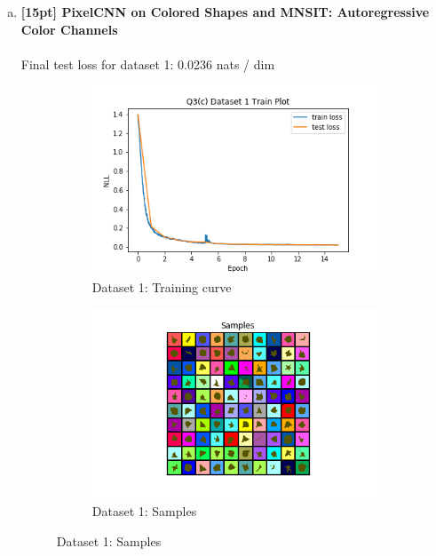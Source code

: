 \documentclass{article}
\begin{document}
\begin{enumerate}[(a)]
\newpage

\item {\bf [15pt] PixelCNN on Colored Shapes and MNSIT: Autoregressive Color Channels} \\\\
Final test loss for dataset 1: 0.0236  nats / dim
\begin{figure}[H]
    \centering
    \begin{subfigure}{0.45\textwidth}
        \centering
        \includegraphics[width=\textwidth]{figures/q3_c_dset1_train_plot.png}
        \caption{Dataset 1: Training curve}
    \end{subfigure}
    \hspace{0.2in}
    \begin{subfigure}{0.45\textwidth}
        \centering
        \includegraphics[width=\textwidth]{figures/q3_c_dset1_samples.png}
        \caption{Dataset 1: Samples}

\end{subfigure}
\end{figure}
\end{enumerate}
\end{document}
